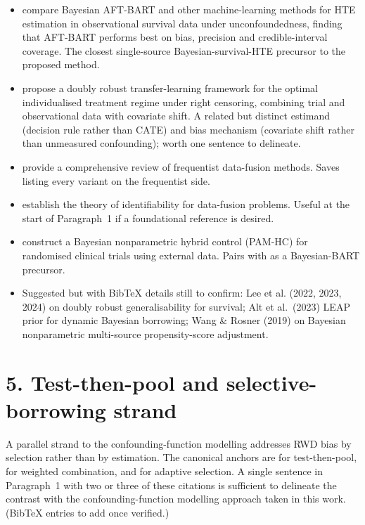 \documentclass[11pt]{article}
\begin{document}
\begin{itemize}
  \item \citet{hu2021estimating} compare Bayesian AFT-BART and other machine-learning methods for HTE estimation in observational survival data under unconfoundedness, finding that AFT-BART performs best on bias, precision and credible-interval coverage. The closest single-source Bayesian-survival-HTE precursor to the proposed method.
  \item \citet{zhao2023efficient} propose a doubly robust transfer-learning framework for the optimal individualised treatment regime under right censoring, combining trial and observational data with covariate shift. A related but distinct estimand (decision rule rather than CATE) and bias mechanism (covariate shift rather than unmeasured confounding); worth one sentence to delineate.
  \item \citet{colnet2024causal} provide a comprehensive review of frequentist data-fusion methods. Saves listing every variant on the frequentist side.
  \item \citet{bareinboim2016causal} establish the theory of identifiability for data-fusion problems. Useful at the start of Paragraph~1 if a foundational reference is desired.
  \item \citet{bi2023pamhc} construct a Bayesian nonparametric hybrid control (PAM-HC) for randomised clinical trials using external data. Pairs with \citet*{zhou2021incorporating} as a Bayesian-BART precursor.
  \item Suggested but with BibTeX details still to confirm: Lee et al. (2022, 2023, 2024) on doubly robust generalisability for survival; Alt et al.\ (2023) LEAP prior for dynamic Bayesian borrowing; Wang \& Rosner (2019) on Bayesian nonparametric multi-source propensity-score adjustment.
\end{itemize}

\section*{5. Test-then-pool and selective-borrowing strand}

A parallel strand to the confounding-function modelling addresses RWD bias by selection rather than by estimation. The canonical anchors are \citet*{viele2014use} for test-then-pool, \citet*{rosenman2023combining} for weighted combination, and \citet*{gaoyang2023adaptive} for adaptive selection. A single sentence in Paragraph~1 with two or three of these citations is sufficient to delineate the contrast with the confounding-function modelling approach taken in this work. (BibTeX entries to add once verified.)
\end{document}
